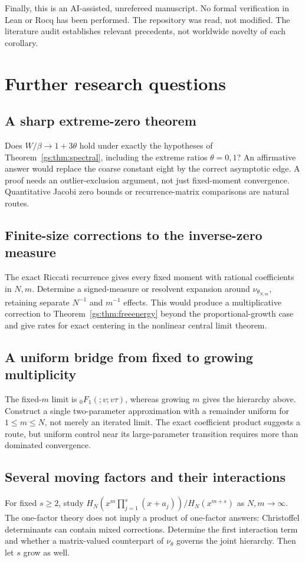 \documentclass[11pt,a4paper]{article}
\numberwithin{equation}{section}
\theoremstyle{definition}
\theoremstyle{remark}
\begin{document}
Finally, this is an AI-assisted, unrefereed manuscript. No formal
verification in Lean or Rocq has been performed. The repository was
read, not modified. The literature audit establishes relevant precedents,
not worldwide novelty of each corollary.

\section{Further research questions}
\label{gs:sec:future}

\subsection{A sharp extreme-zero theorem}\label{gs:x:edge}
Does $W/\beta\to1+3\theta$ hold under exactly the hypotheses of
Theorem~\ref{gs:thm:spectral}, including the extreme ratios $\theta=0,1$?
An affirmative answer would replace the coarse constant eight by the
correct asymptotic edge. A proof needs an outlier-exclusion argument, not
just fixed-moment convergence. Quantitative Jacobi zero bounds or
recurrence-matrix comparisons are natural routes.

\subsection{Finite-size corrections to the inverse-zero measure}\label{gs:x:finite}
The exact Riccati recurrence gives every fixed moment with rational
coefficients in $N,m$. Determine a signed-measure or resolvent expansion
around $\nu_{\theta_{N,m}}$, retaining separate $N^{-1}$ and $m^{-1}$
effects. This would produce a multiplicative correction to
Theorem~\ref{gs:thm:freeenergy} beyond the proportional-growth case and give
rates for exact centering in the nonlinear central limit theorem.

\subsection{A uniform bridge from fixed to growing multiplicity}\label{gs:x:bridge}
The fixed-$m$ limit is ${}_0F_1(;v;v\tau)$, whereas growing $m$ gives the
hierarchy above. Construct a single two-parameter approximation with a
remainder uniform for $1\le m\le N$, not merely an iterated limit.
The exact coefficient product suggests a route, but uniform control near
its large-parameter transition requires more than dominated convergence.

\subsection{Several moving factors and their interactions}\label{gs:x:several}
For fixed $s\ge2$, study
$H_N(x^m\prod_{j=1}^s(x+a_j))/H_N(x^{m+s})$ as $N,m\to\infty$.
The one-factor theory does not imply a product of one-factor answers:
Christoffel determinants can contain mixed corrections. Determine the
first interaction term and whether a matrix-valued counterpart of
$\nu_\theta$ governs the joint hierarchy. Then let $s$ grow as well.
\end{document}
